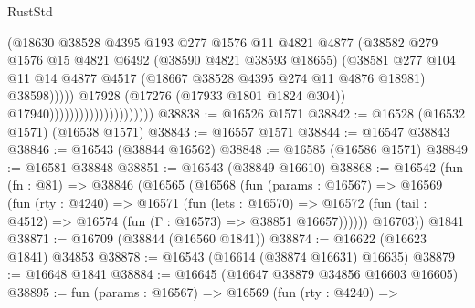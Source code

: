 \begin{lexlean}{RustStd}
\begin{coremodule}
                                                  (@18630
                                                    @38528
                                                    @4395
                                                    @193
                                                    @277
                                                    @1576
                                                    @11
                                                    @4821
                                                    @4877
                                                    (@38582
                                                      @279
                                                      @1576
                                                      @15
                                                      @4821
                                                      @6492
                                                      (@38590 @4821 @38593 @18655)
                                                      (@38581
                                                        @277
                                                        @104
                                                        @11
                                                        @14
                                                        @4877
                                                        @4517
                                                        (@18667 @38528 @4395 @274 @11 @4876 @18981)
                                                        @38598)))))
                                              @17928
                                              (@17276 (@17933 @1801 @1824 @304))
                                              @17940)))))))))))))))))))))
@38838 := @16526 @1571
@38842 := @16528 (@16532 @1571) (@16538 @1571)
@38843 := @16557 @1571
@38844 := @16547 @38843
@38846 := @16543 (@38844 @16562)
@38848 := @16585 (@16586 @1571)
@38849 := @16581 @38848
@38851 := @16543 (@38849 @16610)
@38868 := @16542
    (fun (fn : @81) =>
    @38846
      (@16565
        (@16568
          (fun (params : @16567) =>
          @16569
            (fun (rty : @4240) =>
            @16571
              (fun (lets : @16570) =>
              @16572 (fun (tail : @4512) => @16574 (fun (Γ : @16573) => @38851 @16657))))))
        @16703))
    @1841
@38871 := @16709 (@38844 (@16560 @1841))
@38874 := @16622 (@16623 @1841) @34853
@38878 := @16543 (@16614 (@38874 @16631) @16635)
@38879 := @16648 @1841
@38884 := @16645 (@16647 @38879 @34856 @16603 @16605)
@38895 := fun (params : @16567) =>
  @16569
    (fun (rty : @4240) =>

\end{coremodule}
\end{lexlean}

